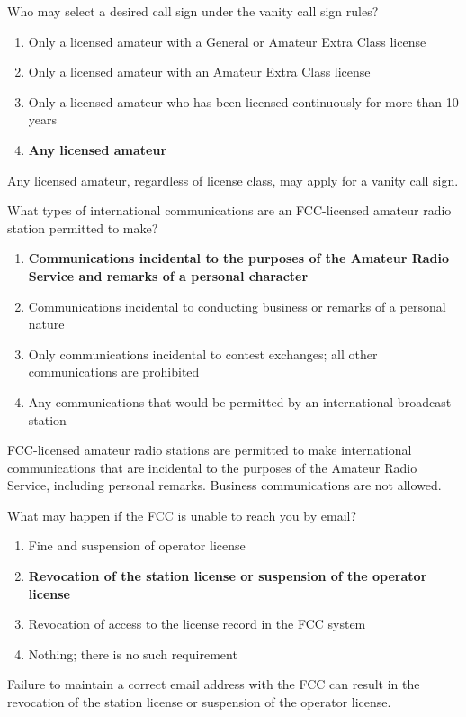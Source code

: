 \begin{tcolorbox}[colback=gray!10!white,colframe=black!75!black,title={T1C02}]
    Who may select a desired call sign under the vanity call sign rules?
    \begin{enumerate}[label=\Alph*),noitemsep]
        \item Only a licensed amateur with a General or Amateur Extra Class license
        \item Only a licensed amateur with an Amateur Extra Class license
        \item Only a licensed amateur who has been licensed continuously for more than 10 years
        \item \textbf{Any licensed amateur}
    \end{enumerate}
\end{tcolorbox}
Any licensed amateur, regardless of license class, may apply for a vanity call sign.


\begin{tcolorbox}[colback=gray!10!white,colframe=black!75!black,title={T1C03}]
    What types of international communications are an FCC-licensed amateur radio station permitted to make?
    \begin{enumerate}[label=\Alph*),noitemsep]
        \item \textbf{Communications incidental to the purposes of the Amateur Radio Service and remarks of a personal character}
        \item Communications incidental to conducting business or remarks of a personal nature
        \item Only communications incidental to contest exchanges; all other communications are prohibited
        \item Any communications that would be permitted by an international broadcast station
    \end{enumerate}
\end{tcolorbox}
FCC-licensed amateur radio stations are permitted to make international communications that are incidental to the purposes of the Amateur Radio Service, including personal remarks. Business communications are not allowed.


\begin{tcolorbox}[colback=gray!10!white,colframe=black!75!black,title={T1C04}]
    What may happen if the FCC is unable to reach you by email?
    \begin{enumerate}[label=\Alph*),noitemsep]
        \item Fine and suspension of operator license
        \item \textbf{Revocation of the station license or suspension of the operator license}
        \item Revocation of access to the license record in the FCC system
        \item Nothing; there is no such requirement
    \end{enumerate}
\end{tcolorbox}
Failure to maintain a correct email address with the FCC can result in the revocation of the station license or suspension of the operator license.

